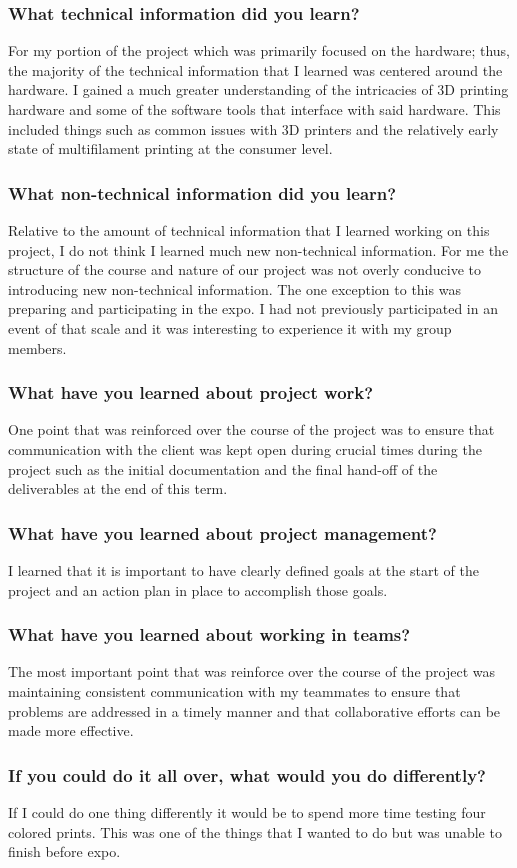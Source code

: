 \subsubsection{What technical information did you learn?}
For my portion of the project which was primarily focused on the hardware; thus, the majority of the technical information that I learned was centered around the hardware. I gained a much greater understanding of the intricacies of 3D printing hardware and some of the software tools that interface with said hardware. This included things such as common issues with 3D printers and the relatively early state of multifilament printing at the consumer level.
\subsubsection{What non-technical information did you learn?}
Relative to the amount of technical information that I learned working on this project, I do not think I learned much new non-technical information. For me the structure of the course and nature of our project was not overly conducive to introducing new non-technical information. The one exception to this was preparing and participating in the expo. I had not previously participated in an event of that scale and it was interesting to experience it with my group members.
\subsubsection{What have you learned about project work?}
One point that was reinforced over the course of the project was to ensure that communication with the client was kept open during crucial times during the project such as the initial documentation and the final hand-off of the deliverables at the end of this term.
\subsubsection{What have you learned about project management?}
I learned that it is important to have clearly defined goals at the start of the project and an action plan in place to accomplish those goals.
\subsubsection{What have you learned about working in teams?}
The most important point that was reinforce over the course of the project was maintaining consistent communication with my teammates to ensure that problems are addressed in a timely manner and that collaborative efforts can be made more effective.
\subsubsection{If you could do it all over, what would you do differently?}
If I could do one thing differently it would be to spend more time testing four colored prints. This was one of the things that I wanted to do but was unable to finish before expo.